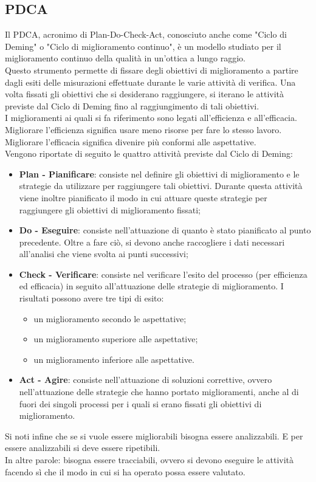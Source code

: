 \documentclass[../PianoDiQualifica.tex]{subfiles}
\begin{document}
\begin{appendices}

\section{PDCA}
	Il PDCA, acronimo di Plan-Do-Check-Act, conosciuto anche come "Ciclo di Deming" o "Ciclo di miglioramento continuo", è un modello studiato per il miglioramento continuo della qualità in un'ottica a lungo raggio.\\
	Questo strumento permette di fissare degli obiettivi di miglioramento a partire dagli esiti delle misurazioni effettuate durante le varie attività di verifica. Una volta fissati gli obiettivi che si desiderano raggiungere, si iterano le attività previste dal Ciclo di Deming fino al raggiungimento di tali obiettivi.\\
	I miglioramenti ai quali si fa riferimento sono legati all'efficienza e all'efficacia. Migliorare l'efficienza significa usare meno risorse per fare lo stesso lavoro. Migliorare l'efficacia significa divenire più conformi alle aspettative.\\
	Vengono riportate di seguito le quattro attività previste dal Ciclo di Deming:
	\begin{itemize}
		\item \textbf{Plan - Pianificare}: consiste nel definire gli obiettivi di miglioramento e le strategie da utilizzare per raggiungere tali obiettivi. Durante questa attività viene inoltre pianificato il modo in cui attuare queste strategie per raggiungere gli obiettivi di miglioramento fissati;
		\item \textbf{Do - Eseguire}: consiste nell'attuazione di quanto è stato pianificato al punto precedente. Oltre a fare ciò, si devono anche raccogliere i dati necessari all’analisi che viene svolta ai punti successivi;
		\item \textbf{Check - Verificare}: consiste nel verificare l'esito del processo (per efficienza ed efficacia) in seguito all'attuazione delle strategie di miglioramento. I risultati possono avere tre tipi di esito:
		\begin{itemize}
			\item un miglioramento secondo le aspettative;
			\item un miglioramento superiore alle aspettative;
			\item un miglioramento inferiore alle aspettative.
		\end{itemize}
		\item \textbf{Act - Agire}: consiste nell'attuazione di soluzioni correttive, ovvero nell'attuazione delle strategie che hanno portato miglioramenti, anche al di fuori dei singoli processi per i quali si erano fissati gli obiettivi di miglioramento.
	\end{itemize}
	Si noti infine che se si vuole essere migliorabili bisogna essere analizzabili. E per essere analizzabili si deve essere ripetibili.\\
	In altre parole: bisogna essere tracciabili, ovvero si devono eseguire le attività facendo sì che il modo in cui si ha operato possa essere valutato.
	
\end{appendices}
\end{document}
